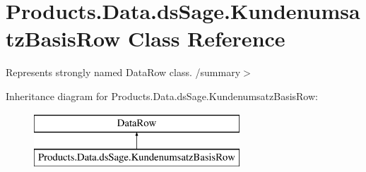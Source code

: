 \hypertarget{class_products_1_1_data_1_1ds_sage_1_1_kundenumsatz_basis_row}{}\section{Products.\+Data.\+ds\+Sage.\+Kundenumsatz\+Basis\+Row Class Reference}
\label{class_products_1_1_data_1_1ds_sage_1_1_kundenumsatz_basis_row}


Represents strongly named Data\+Row class. /summary$>$  


Inheritance diagram for Products.\+Data.\+ds\+Sage.\+Kundenumsatz\+Basis\+Row\+:\begin{figure}[H]
\begin{center}
\leavevmode
\includegraphics[height=2.000000cm]{class_products_1_1_data_1_1ds_sage_1_1_kundenumsatz_basis_row}
\end{center}
\end{figure}

